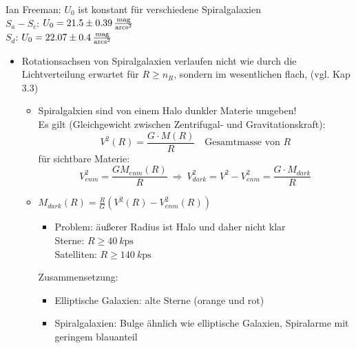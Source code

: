 Ian Freeman: $U_0$ ist konstant für verschiedene Spiralgalaxien\\
$S_a-S_c$: $U_0=\num{21.5}\pm\SI{0.39}{\frac{\text{mag}}{\text{arc}\s^2}}$\\
$S_d$: $U_0=\num{22.07}\pm\SI{0.4}{\frac{\text{mag}}{\text{arc}\s^2}}$
\begin{itemize}
	\item Rotationsachsen von Spiralgalaxien verlaufen nicht wie durch die Lichtverteilung erwartet für $R\geq n_R$, sondern im wesentlichen flach, (vgl. Kap 3.3)
		\begin{itemize}
			\item Spiralgalxien sind von einem Halo dunkler Materie umgeben!\\
				Es gilt (Gleichgewicht zwischen Zentrifugal- und Gravitationskraft):
				\begin{equation*}
					V^2(R)=\frac{G\cdot M(R)}{R} \quad\text{Gesamtmasse von $R$}
				\end{equation*}
				für sichtbare Materie:
				\begin{equation*}
					V^2_{enm}=\frac{GM_{enm}(R)}{R} \ \Rightarrow\ V^2_{dark}=V^2-V_{enm}^2=\frac{G\cdot M_{dark}}{R}
				\end{equation*}
			\item $M_{dark}(R)=\frac{R}{G}\left(V^2(R)-V^2_{enm}(R)\right)$
				\begin{itemize}[label={\textbullet}]
					\item Problem: äußerer Radius ist Halo und daher nicht klar\\
						Sterne: $R\geq\SI{40}{k\ps}$\\
						Satelliten: $R\geq\SI{140}{k\ps}$
				\end{itemize}
				Zusammensetzung:
				\begin{itemize}[label={}]
					\item Elliptische Galaxien: alte Sterne (orange und rot)
					\item Spiralgalaxien: Bulge ähnlich wie elliptische Galaxien, Spiralarme mit geringem blauanteil
				\end{itemize}
		\end{itemize}
\end{itemize}
